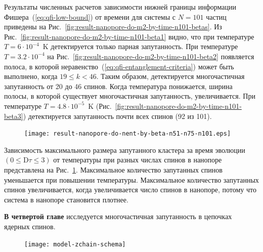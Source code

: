 Результаты численных расчетов зависимости нижней границы информации Фишера~(\ref{eq:qfi-low-bound}) от времени для системы с $N=101$ частиц приведены на Рис.~\ref{fig:result-nanopore-do-m2-by-time-n101-betas}.
Из Рис.~\ref{fig:result-nanopore-do-m2-by-time-n101-beta1} видно,
что при температуре $T=6\cdot10^{-4}$~K детектируется только парная запутанность.
При температуре $T=3.2\cdot10^{-4}$ на Рис.~\ref{fig:result-nanopore-do-m2-by-time-n101-beta2} появляется полоса, в которой неравенство~(\ref{eq:qfi-entanglement-criteria}) может быть выполнено, когда $19 \leq k < 46$.
Таким образом, детектируется многочастичная запутанность от 20 до 46 спинов.
Когда температура понижается, ширина полосы, в которой существует многочастичная запутанность, увеличивается.
При температуре $T=4.8\cdot10^{-5}$~K (Рис.~\ref{fig:result-nanopore-do-m2-by-time-n101-beta3}) детектируется запутанность почти всех спинов (92 из 101).

\begin{figure}[H]
 	\texttt{[image: result-nanopore-do-nent-by-beta-n51-n75-n101.eps]}
	\caption{\protect}
	\label{fig:result-nanopore-do-nent-by-beta-n51-n75-n101}
\end{figure}

Зависимость максимального размера запутанного кластера за время эволюции $({0}\leq \mathrm{D}\tau\leq{3})$ от температуры при разных числах спинов в нанопоре представлена на Рис.~\ref{fig:result-nanopore-do-nent-by-beta-n51-n75-n101}.
Максимальное количество запутанных спинов уменьшается при повышении температуры.
Максимальное количество запутанных спинов увеличивается, когда увеличивается число спинов в нанопоре, потому что система в нанопоре становится плотнее.


\textbf{В четвертой главе} исследуется многочастичная запутанность в цепочках ядерных спинов.

\begin{figure}
  \texttt{[image: model-zchain-schema]}
  \caption{\protect}
  \label{fig:model-zchain-schema}
\end{figure}

